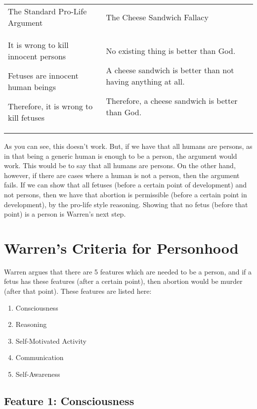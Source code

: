 \begin{tabular}{p{2.75in}|p{2.75in}}
The Standard Pro-Life Argument&The Cheese Sandwich Fallacy\\
\begin{earg}
    \item[] It is wrong to kill innocent persons
    \item[] Fetuses are innocent human beings
    \item[] Therefore, it is wrong to kill fetuses
\end{earg}&
\begin{earg}
    \item[] No existing thing is better than God.
    \item[] A cheese sandwich is better than not having anything at all.
    \item[] Therefore, a cheese sandwich is better than God. 
\end{earg}
\end{tabular}

As you can see, this doesn’t work. But, if we have that all humans are persons, as in that being a generic human is enough to be a person, the argument would work. This would be to say that all humans are persons. On the other hand, however, if there are cases where a human is not a person, then the argument fails. If we can show that all fetuses (before a certain point of development) and not persons, then we have that abortion is permissible (before a certain point in development), by the pro-life style reasoning. Showing that no fetus (before that point) is a person is Warren's next step.  

\section{Warren's Criteria for Personhood}
Warren argues that there are 5 features which are needed to be a person, and if a fetus has these features (after a certain point), then abortion would be murder (after that point). These features are listed here:
\begin{enumerate}
\item Consciousness 	
\item Reasoning
\item Self-Motivated Activity 
\item Communication
\item Self-Awareness
\end{enumerate}

\subsection{Feature 1: Consciousness}

